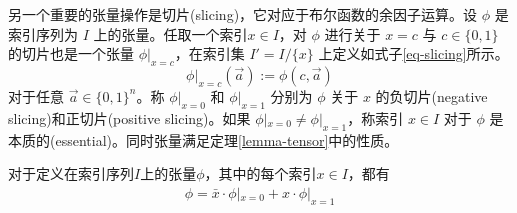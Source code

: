 另一个重要的张量操作是切片(slicing)，它对应于布尔函数的余因子运算。设 $\phi$ 是索引序列为 $I$ 上的张量。任取一个索引\(x\in I\)，对 $\phi$ 进行关于 $x = c$ 与 $c \in \{0, 1\}$ 的切片也是一个张量 $\phi|_{x=c}$，在索引集 $I' =I/\{x\}$ 上定义如式子\ref{eq-slicing}所示。
\begin{equation}
    \label{eq-slicing}
\phi|_{x=c}(\overrightarrow{a}) := \phi(c, \overrightarrow{a})
\end{equation}
对于任意 $\overrightarrow{a} \in \{0, 1\}^n$。称 $\phi|_{x=0}$ 和 $\phi|_{x=1}$ 分别为 $\phi$ 关于 $x$ 的负切片(negative slicing)和正切片(positive slicing)。如果 $\phi|_{x=0} \neq \phi|_{x=1}$，称索引 $x \in I$ 对于 $\phi$ 是本质的(essential)。同时张量满足定理\ref{lemma-tensor}中的性质。

\begin{lemma}
    \label{lemma-tensor}
    对于定义在索引序列\(I\)上的张量\(\phi\)，其中的每个索引\(x\in I\)，都有
    \begin{align}
        \phi = \bar{x}\cdot \phi|_{x=0}+x\cdot \phi|_{x=1}
    \end{align}
\end{lemma}

